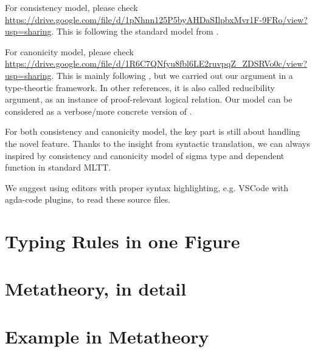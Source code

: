 For consistency model, please check \\ \href{https://drive.google.com/file/d/1pNhnn125P5byAHDaSIlpbxMvr1F-9FRo/view?usp=sharing}{https://drive.google.com/file/d/1pNhnn125P5byAHDaSIlpbxMvr1F-9FRo/view?usp=sharing}. This is following the standard model from \citet{altkap2016,kaposi2017type,kaposi2019gluing}.

For canonicity model, please check \\ \href{https://drive.google.com/file/d/1R6C7QNfyu8fbl6LE2ruvpqZ_ZDSRVo0c/view?usp=sharing}{https://drive.google.com/file/d/1R6C7QNfyu8fbl6LE2ruvpqZ_ZDSRVo0c/view?usp=sharing}. This is mainly following \citet{coquand2018canonicity,sterling2019algebraic}, but we carried out our argument in a type-theortic framework.  In other references, it is also called reducibility argument, as an instance of proof-relevant logical relation. Our model can be considered as a verbose/more concrete version of \citet{kaposi2019gluing}.

For both consistency and canonicity model, the key part is still about handling the novel feature. Thanks to the insight from syntactic translation, we can always inspired by consistency and canonicity model of sigma type and dependent function in standard MLTT.

We suggest using editors with proper syntax highlighting, e.g. VSCode with agda-code plugins, to read these source files.

\section{Typing Rules in one Figure}


\section{Metatheory, in detail}

\label{sec:metatheory}


\section{Example in Metatheory}\label{sec:coqexample}
